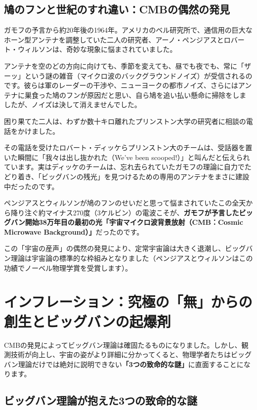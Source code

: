 \subsection{鳩のフンと世紀のすれ違い：CMBの偶然の発見}

ガモフの予言から約20年後の1964年。アメリカのベル研究所で、通信用の巨大なホーン型アンテナを調整していた二人の研究者、アーノ・ペンジアスとロバート・ウィルソンは、奇妙な現象に悩まされていました。

アンテナを空のどの方向に向けても、季節を変えても、昼でも夜でも、常に「ザーッ」という謎の雑音（マイクロ波のバックグラウンドノイズ）が受信されるのです。彼らは軍のレーダーの干渉や、ニューヨークの都市ノイズ、さらにはアンテナに巣食った鳩のフンが原因だと思い、自ら鳩を追い払い懸命に掃除をしましたが、ノイズは決して消えませんでした。

困り果てた二人は、わずか数十キロ離れたプリンストン大学の研究者に相談の電話をかけました。

その電話を受けたロバート・ディッケらプリンストン大のチームは、受話器を置いた瞬間に「我々は出し抜かれた（We've been scooped!）」と叫んだと伝えられています。実はディッケのチームは、忘れ去られていたガモフの理論に自力でたどり着き、「ビッグバンの残光」を見つけるための専用のアンテナをまさに建設中だったのです。

ペンジアスとウィルソンが鳩のフンのせいだと思って悩まされていたこの全天から降り注ぐ約マイナス270度（3ケルビン）の電波こそが、\textbf{ガモフが予言したビッグバン開始38万年目の最初の光「宇宙マイクロ波背景放射（CMB：Cosmic Microwave Background）」}だったのです。

この「宇宙の産声」の偶然の発見により、定常宇宙論は大きく退潮し、ビッグバン理論は宇宙論の標準的な枠組みとなりました（ペンジアスとウィルソンはこの功績でノーベル物理学賞を受賞します）。

\section{インフレーション：究極の「無」からの創生とビッグバンの起爆剤}

CMBの発見によってビッグバン理論は確固たるものになりました。しかし、観測技術が向上し、宇宙の姿がより詳細に分かってくると、物理学者たちはビッグバン理論だけでは絶対に説明できない\textbf{「3つの致命的な謎」}に直面することになります。

\subsection{ビッグバン理論が抱えた3つの致命的な謎}

